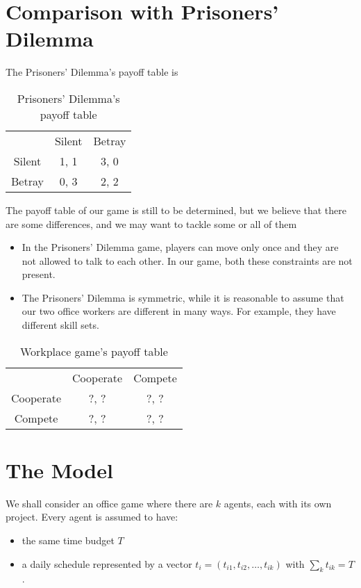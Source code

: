 \documentclass[11pt, a4paper]{article}
\begin{document}
\section{Comparison with Prisoners' Dilemma}
The Prisoners' Dilemma's payoff table is 
\begin{table}[h]
	\centering
	\caption{Prisoners' Dilemma's payoff table}
	\begin{tabular}{c c c}
		        & Silent & Betray \\
		Silent  & 1, 1    & 3, 0     \\
		Betray  & 0, 3    & 2, 2
	\end{tabular}
\end{table}

The payoff table of our game is still to be determined, but we believe that there are some differences, and we may want to tackle some or all of them
\begin{itemize}
	\item In the Prisoners' Dilemma game, players can move only once and they are not allowed to talk to each other. In our game, both these constraints are not present.
	\item The Prisoners' Dilemma is symmetric, while it is reasonable to assume that our two office workers are different in many ways. For example, they have different skill sets.
\end{itemize}
\begin{table}[h]
	\centering
	\caption{Workplace game's payoff table}
	\begin{tabular}{c c c}
		          & Cooperate & Compete \\
		Cooperate & ?, ?      & ?, ?    \\
		 Compete  & ?, ?      & ?, ?
	\end{tabular}
\end{table}

\newpage

\section{The Model}
We shall consider an office game where there are $k$ agents, each with its own project. Every agent is assumed to have:
\begin{itemize}
\item the same time budget $T$
\item a daily schedule represented by a vector $t_i=(t_{i1},t_{i2},\ldots,t_{ik})$ with $\sum_{k}t_{ik}=T$.
\end{itemize}
\end{document}
